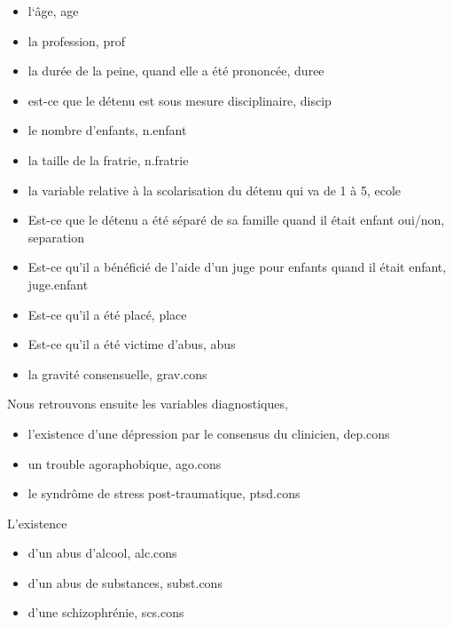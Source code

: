 \documentclass[11pt]{article}
\begin{document}
\begin{itemize}
\item l‘âge, age

\item la profession, prof

\item la durée de la peine, quand elle a été prononcée, duree

\item est-ce que le détenu est sous mesure disciplinaire, discip

\item le nombre d'enfants, n.enfant

\item la taille de la fratrie, n.fratrie

\item la variable relative à la scolarisation du détenu qui va de 1 à 5, ecole

\item Est-ce que le détenu a été séparé de sa famille quand il était enfant oui/non,
separation

\item Est-ce qu'il a bénéficié de l'aide d’un juge pour enfants quand il était
enfant, juge.enfant

\item Est-ce qu'il a été placé, place

\item Est-ce qu'il a été victime d'abus, abus

\item la gravité consensuelle, grav.cons
\end{itemize}

Nous retrouvons ensuite les variables diagnostiques,
\begin{itemize}
\item l'existence d'une dépression par le consensus du clinicien, dep.cons

\item un trouble agoraphobique, ago.cons

\item le syndrôme de stress post-traumatique, ptsd.cons
\end{itemize}

L'existence
\begin{itemize}
\item d'un abus d'alcool, alc.cons

\item d'un abus de substances, subst.cons

\item d'une schizophrénie, scs.cons
\end{itemize}
\end{document}
